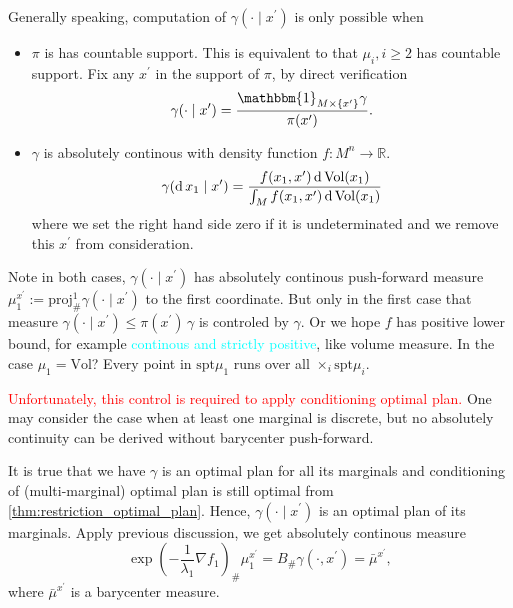 Generally speaking, computation of $\gamma(\cdot \mid x^\prime)$ is only possible when
\begin{itemize}
	\item $\pi$ is has countable support.
	      This is equivalent to that $\mu_i, i \geq 2$ has countable support.
	      Fix any $x^\prime$ in the support of $\pi$, by direct verification
	      \[
		      \gamma(\cdot \mid x^\prime) =
		      \frac{
			      \mathbbm{1}_{M \times \{x^\prime\}}
			      \gamma
		      }{\pi(x^\prime)}.
	      \]
	\item $\gamma$ is absolutely continous with density function $f: M^n \rightarrow \mathbb{R} $.
	      \[
		      \gamma(\operatorname{d} x_1 \mid x^\prime) =
		      \frac{
			      f(x_1, x^\prime) \operatorname{d} \text{Vol}(x_1)
		      }
		      {\int_{M} f(x_1, x^\prime) \operatorname{d} \text{Vol}(x_1)
		      }
	      \]
	      where we set the right hand side zero if it is undeterminated
	      and we remove this $x^\prime$ from consideration.
\end{itemize}
Note in both cases,
$\gamma(\cdot \mid x^\prime)$
has absolutely continous push-forward measure
$\mu_1^{x^\prime} := \text{proj}^1_{\#}\gamma(\cdot \mid x^\prime)$
to the first coordinate.
But only in the first case that
measure $\gamma(\cdot \mid x^\prime) \leq \pi(x^\prime) \, \gamma$ is controled by $\gamma$.
Or we hope $f$ has positive lower bound,
for example \textcolor{cyan}{continous and strictly positive}, like volume measure.
In the case $\mu_1=\text{Vol}$? Every point in $\text{spt}\mu_1$ runs over all $\times_i \text{spt}\mu_i$.

\textcolor{red}{Unfortunately, this control is required to apply conditioning optimal plan.}
One may consider the case when at least one marginal is discrete,
but no absolutely continuity can be derived without barycenter push-forward.

It is true that we have $\gamma$ is an optimal plan for all its marginals
and conditioning of (multi-marginal) optimal plan is still optimal from \cref{thm:restriction_optimal_plan}.
Hence, $\gamma(\cdot \mid x^\prime)$ is an optimal plan of its marginals.
Apply previous discussion, we get absolutely continous measure
\[
	\exp(-\frac{1}{\lambda_1}\nabla f_1)_{\#}  \mu_1^{x^\prime}=
	B_{\#}\gamma(\cdot, x^\prime) =
	\bar{\mu}^{x^\prime},
\]
where $\bar{\mu}^{x^\prime}$ is a barycenter measure.

